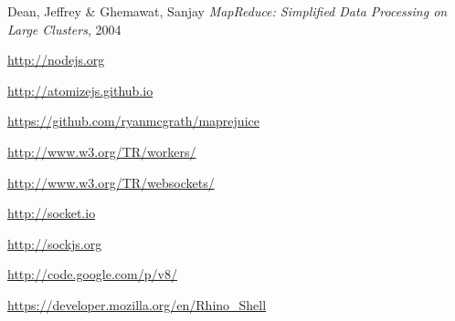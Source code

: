 \begin{thebibliography}{9}

Dean, Jeffrey \& Ghemawat, Sanjay
\emph{MapReduce: Simplified Data Processing on Large Clusters},
2004

\url{http://nodejs.org}

\url{http://atomizejs.github.io}

\url{https://github.com/ryanmcgrath/maprejuice}

\url{http://www.w3.org/TR/workers/}

\url{http://www.w3.org/TR/websockets/}

\url{http://socket.io}

\url{http://sockjs.org}

\url{http://code.google.com/p/v8/}

\url{https://developer.mozilla.org/en/Rhino_Shell}

\end{thebibliography}